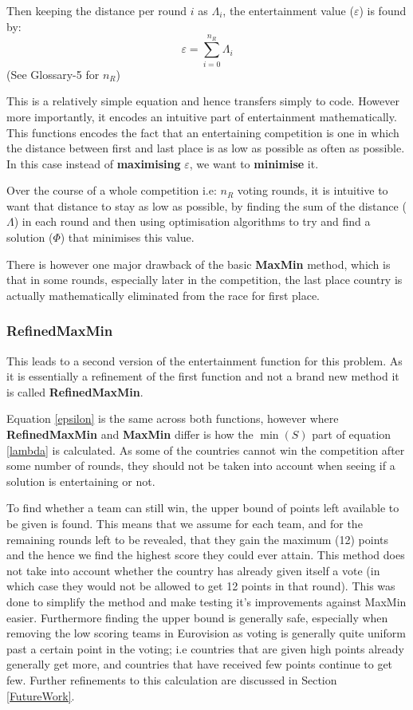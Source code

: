 \documentclass[12pt]{report}
\begin{document}
Then keeping the distance per round $i$ as $\Lambda_i$, the entertainment value ($\varepsilon$) is found by:
\begin{equation}\label{epsilon}
	\varepsilon = \sum_{i=0}^{n_R}  \Lambda_i
\end{equation}
(See Glossary-5 for $n_{R}$)

This is a relatively simple equation and hence transfers simply to code. However more importantly, it encodes an intuitive part of entertainment mathematically. This functions encodes the fact that an entertaining competition is one in which the distance between first and last place is as low as possible as often as possible. In this case instead of \textbf{maximising} $\varepsilon$, we want to \textbf{minimise} it.

Over the course of a whole competition i.e: $n_R$ voting rounds, it is intuitive to want that distance to stay as low as possible, by finding the sum of the distance ($\Lambda$) in each round and then using optimisation algorithms to try and find a solution ($\Phi$) that minimises this value.

There is however one major drawback of the basic \textbf{MaxMin} method, which is that in some rounds, especially later in the competition, the last place country is actually mathematically eliminated from the race for first place.

\subsubsection{RefinedMaxMin}
This leads to a second version of the entertainment function for this problem. As it is essentially a refinement of the first function and not a brand new method it is called \textbf{RefinedMaxMin}.

Equation \ref{epsilon} is the same across both functions, however where \textbf{RefinedMaxMin} and \textbf{MaxMin} differ is how the $\min(S)$ part of equation \ref{lambda} is calculated. As some of the countries cannot win the competition after some number of rounds, they should not be taken into account when seeing if a solution is entertaining or not.

To find whether a team can still win, the upper bound of points left available to be given is found. This means that we assume for each team, and for the remaining rounds left to be revealed, that they gain the maximum (12) points and the hence we find the highest score they could ever attain. This method does not take into account whether the country has already given itself a vote (in which case they would not be allowed to get 12 points in that round). This was done to simplify the method and make testing it's improvements against MaxMin easier. Furthermore finding the upper bound is generally safe, especially when removing the low scoring teams in Eurovision as voting is generally quite uniform past a certain point in the voting; i.e countries that are given high points already generally get more, and countries that have received few points continue to get few. Further refinements to this calculation are discussed in Section \ref{FutureWork}.
\end{document}
